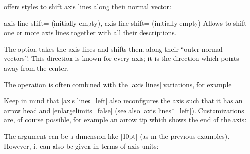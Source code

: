 \PGFPlots{} offers styles to shift axis lines along their normal vector:

\begin{pgfplotsxykeylist}{
    axis \x\space line shift= (initially empty), axis
    line shift= (initially empty)} Allows to shift one
    or more axis lines together with all their descriptions.

\begin{codeexample}[]
\end{codeexample}
    The option takes the axis lines and shifts them along their ``outer normal
    vectors''. This direction is known for every axis; it is the direction
    which points away from the center.

    The operation is often combined with the |axis lines| variations, for
    example
\begin{codeexample}[]
\end{codeexample}
    Keep in mind that |axis lines=left| also reconfigures the axis such that it
    has an arrow head and |enlargelimits=false| (see also |axis lines*=left|).
    Customizations are, of course possible, for example an arrow tip which
    shows the end of the axis:
\begin{codeexample}[]
\end{codeexample}

    The argument  can be a dimension like |10pt| (as in
    the previous examples). However, it can also be given in terms of axis
    units:
\begin{codeexample}[]
\end{codeexample}


\end{pgfplotsxykeylist}
